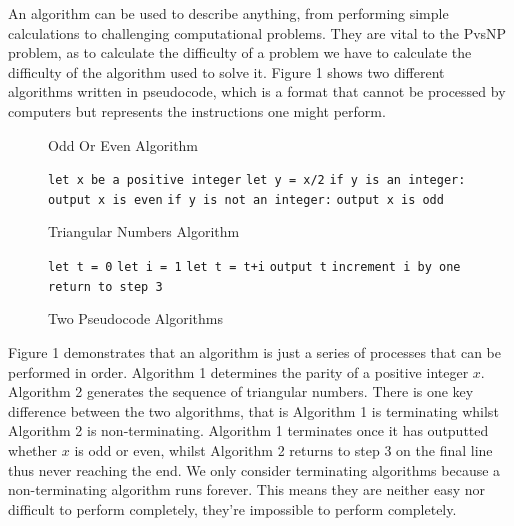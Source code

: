 \documentclass[twoside,10pt]{article}
\begin{document}
An algorithm can be used to describe anything, from performing simple calculations to challenging computational problems. They are vital to the PvsNP problem, as to calculate the difficulty of a problem we have to calculate the difficulty of the algorithm used to solve it. Figure 1 shows two different algorithms written in pseudocode, which is a format that cannot be processed by computers but represents the instructions one might perform.

\begin{figure}[H]
\centering
\begin{minipage}[t]{0.4\textwidth}
\begin{algorithm}[H]
\caption{Odd Or Even Algorithm}
\begin{algorithmic}[1]
\State \texttt{let x be a positive integer}
\State \texttt{let y = x/2}
\State \texttt{if y is an integer:}
\State \texttt{output x is even}
\State \texttt{if y is not an integer:}
\State \texttt{output x is odd}
\end{algorithmic}
\end{algorithm}
\end{minipage}
\hspace{0.05\textwidth}
\begin{minipage}[t]{0.45\textwidth}
\begin{algorithm}[H]
\caption{Triangular Numbers Algorithm}
\begin{algorithmic}[1]
\State \texttt{let t = 0}
\State \texttt{let i = 1}
\State \texttt{let t = t+i}
\State \texttt{output t}
\State \texttt{increment i by one}
\State \texttt{return to step 3}
\end{algorithmic}
\end{algorithm}
\end{minipage}
\caption{Two Pseudocode Algorithms}
\label{fig:algorithmintro}
\end{figure}

Figure 1 demonstrates that an algorithm is just a series of processes that can be performed in order. Algorithm 1 determines the parity of a positive integer $x$. Algorithm 2 generates the sequence of triangular numbers. There is one key difference between the two algorithms, that is Algorithm 1 is terminating whilst Algorithm 2 is non-terminating. Algorithm 1 terminates once it has outputted whether $x$ is odd or even, whilst Algorithm 2 returns to step 3 on the final line thus never reaching the end. We only consider terminating algorithms because a non-terminating algorithm runs forever. This means they are neither easy nor difficult to perform completely, they're impossible to perform completely.
\end{document}
